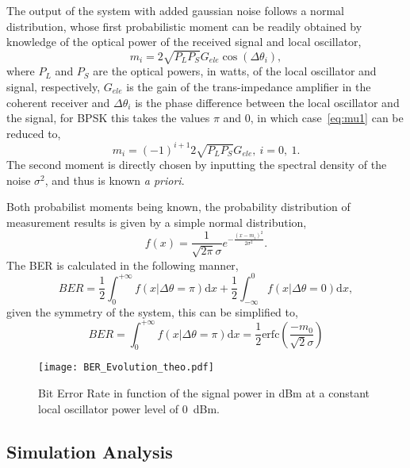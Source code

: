 The output of the system with added gaussian noise follows a normal distribution, whose first probabilistic moment can be readily obtained by knowledge of the optical power of the received signal and local oscillator,
\begin{equation}\label{eq:mu1}
m_i=2\sqrt{P_LP_S}G_{ele}\cos(\Delta\theta_i),
\end{equation}
where $P_L$ and $P_S$ are the optical powers, in watts, of the local oscillator and signal, respectively, $G_{ele}$ is the gain of the trans-impedance amplifier in the coherent receiver and $\Delta\theta_i$ is the phase difference between the local oscillator and the signal, for BPSK this takes the values $\pi$ and 0, in which case~\eqref{eq:mu1} can be reduced to,
\begin{equation}
m_i=(-1)^{i+1}2\sqrt{P_LP_S}G_{ele},~i=0,~1.
\end{equation}
The second moment is directly chosen by inputting the spectral density of the noise $\sigma^2$, and thus is known \textit{a priori}.
\par
Both probabilist moments being known, the probability distribution of measurement results is given by a simple normal distribution,
\begin{equation}
f(x)=\frac{1}{\sqrt{2\pi}\sigma}e^{-\frac{(x-m_i)^2}{2\sigma^2}}.
\end{equation}
The BER is calculated in the following manner,
\begin{equation}
BER=\frac{1}{2}\int_0^{+\infty}f(x|\Delta\theta=\pi)\text{d}x+\frac{1}{2}\int^0_{-\infty}f(x|\Delta\theta=0)\text{d}x,
\end{equation}
given the symmetry of the system, this can be simplified to,
\begin{equation}\label{eq:BERtheoretical}
BER=\int_0^{+\infty}f(x|\Delta\theta=\pi)\text{d}x=\frac{1}{2}\text{erfc}\left(\frac{-m_0}{\sqrt{2}\sigma}\right)
\end{equation}

\begin{figure}[H]
\centering
\texttt{[image: BER\_Evolution\_theo.pdf]}
\caption{Bit Error Rate in function of the signal power in dBm at a constant local oscillator power level of 0~dBm.}
\label{fig:berevolution}
\end{figure}

\subsection{Simulation Analysis}

